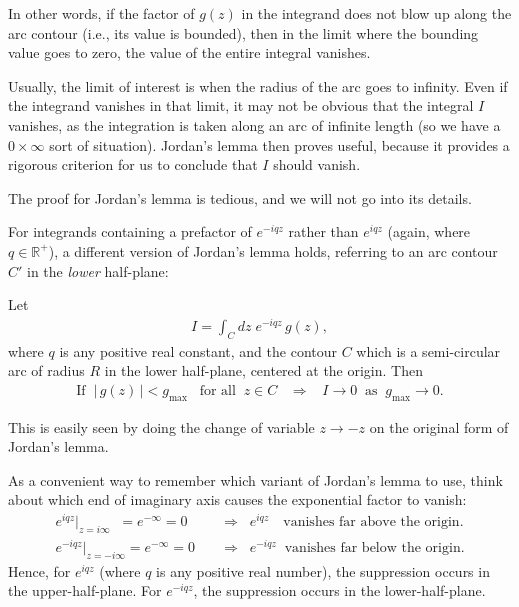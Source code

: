 \documentclass[10pt,a4paper]{article}
\begin{document}
\noindent
In other words, if the factor of $g(z)$ in the integrand does not blow
up along the arc contour (i.e., its value is bounded), then in the
limit where the bounding value goes to zero, the value of the entire
integral vanishes.

Usually, the limit of interest is when the radius of the arc goes to
infinity. Even if the integrand vanishes in that limit, it may not be
obvious that the integral $I$ vanishes, as the integration is taken
along an arc of infinite length (so we have a $0\times\infty$ sort of
situation). Jordan's lemma then proves useful, because it provides a
rigorous criterion for us to conclude that $I$ should vanish.

The proof for Jordan's lemma is tedious, and we will not go into its
details.

 
For integrands containing a prefactor of $e^{-iqz}$ rather than
$e^{iqz}$ (again, where $q \in \mathbb{R}^+$), a different version of
Jordan's lemma holds, referring to an arc contour $C'$ in the
\textit{lower} half-plane:

\begin{framed}
\noindent
Let
\begin{align}
  I = \int_C dz \; e^{-iqz} \,g(z),
\end{align}
where $q$ is any positive real constant, and the contour $C$ which is a semi-circular arc of radius $R$ in the lower half-plane, centered at the origin. Then
\begin{align}
  \text{If}\;\; \big|\,g(z)\,\big| < g_{\mathrm{max}} \;\;\;\text{for all}\;\;z \in C \;\;\;\Rightarrow \;\;\; I \rightarrow 0 \;\;\mathrm{as}\;\; g_{\mathrm{max}} \rightarrow 0.
\end{align}
\end{framed}

\noindent
This is easily seen by doing the change of variable $z \rightarrow -z$
on the original form of Jordan's lemma.

As a convenient way to remember which variant of Jordan's lemma to
use, think about which end of imaginary axis causes the exponential
factor to vanish:
\begin{align}
  e^{iqz}\big|_{z = i\infty}\;\; = e^{-\infty} = 0\quad &\Rightarrow \;\; e^{iqz} \;\;\;\,\text{vanishes far above the origin}. \\
  e^{-iqz}\big|_{z = -i\infty} = e^{-\infty} = 0\quad &\Rightarrow \;\; e^{-iqz} \;\;\textrm{vanishes far below the origin}.
\end{align}
Hence, for $e^{iqz}$ (where $q$ is any positive real number), the
suppression occurs in the upper-half-plane. For $e^{-iqz}$, the
suppression occurs in the lower-half-plane.
\end{document}
